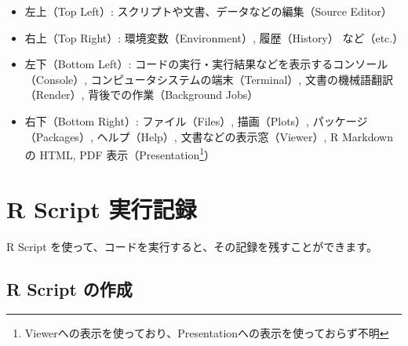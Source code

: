 \documentclass[
  xelatex, ja=standard]{bxjsbook}
\providecommand{\tightlist}{%
  \setlength{\itemsep}{0pt}\setlength{\parskip}{0pt}}
\theoremstyle{definition}
\theoremstyle{definition}
\theoremstyle{definition}
\theoremstyle{definition}
\theoremstyle{remark}
\begin{document}
\begin{itemize}
\tightlist
\item
  左上（Top Left）: スクリプトや文書、データなどの編集（Source Editor）
\item
  右上（Top Right）: 環境変数（Environment）, 履歴（History） など（etc.）
\item
  左下（Bottom Left）: コードの実行・実行結果などを表示するコンソール（Console）, コンピュータシステムの端末（Terminal）, 文書の機械語翻訳（Render）, 背後での作業（Background Jobs）
\item
  右下（Bottom Right）: ファイル（Files）, 描画（Plots）, パッケージ（Packages）, ヘルプ（Help）, 文書などの表示窓（Viewer）, R Markdown の HTML, PDF 表示（Presentation\footnote{Viewerへの表示を使っており、Presentationへの表示を使っておらず不明}）
\end{itemize}

\hypertarget{r-script-ux5b9fux884cux8a18ux9332}{%
\section{R Script 実行記録}\label{r-script-ux5b9fux884cux8a18ux9332}}

R Script を使って、コードを実行すると、その記録を残すことができます。

\hypertarget{r-script-ux306eux4f5cux6210}{%
\subsection{R Script の作成}\label{r-script-ux306eux4f5cux6210}}
\end{document}
